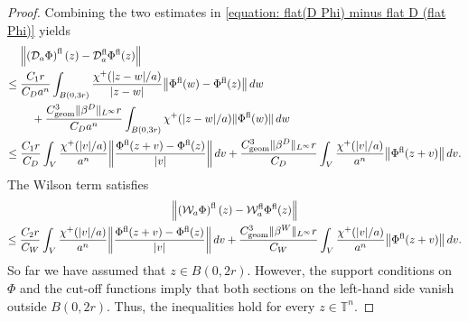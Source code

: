 \documentclass[a4paper,oneside,12pt]{amsart}
\theoremstyle{plain}
\theoremstyle{definition}
\theoremstyle{remark}
\DeclarePairedDelimiter{\abs}{\lvert}{\rvert}
\DeclarePairedDelimiter{\norm}{\lVert}{\rVert}
\newcommand{\flattorus}{\mathbb{T}^n}
\newcommand{\mesoscopicDiracoperator}[1][a]{\mathcal{D}_{#1}}
\newcommand{\mesoscopicWilsonterm}[1][a]{\mathcal{W}_{#1}}
\newcommand{\cutoff}{\beta}
\newcommand{\cutoffDirac}{\cutoff^D}
\newcommand{\cutoffWilson}{\cutoff^W}
\newcommand{\cutoffupper}{\chi^+}
\newcommand{\flatmesoscopicDiracoperator}{\mesoscopicDiracoperator^{\mathrm{fl}}}
\newcommand{\flatmesoscopicWilsonterm}{\mesoscopicWilsonterm^{\mathrm{fl}}}
\newcommand{\flatmodel}[1]{#1^{\mathrm{fl}}}
\newcommand{\constantgeometric}{C_{\mathrm{geom}}}
\begin{document}
\begin{proof}
  Combining the two estimates in \eqref{equation: flat(D Phi) minus flat D (flat Phi)} yields
  \begin{equation}
    \begin{aligned}
    & \norm*{\flatmodel{\left(\mesoscopicDiracoperator \Phi\right)}(z) - \flatmesoscopicDiracoperator \flatmodel{\Phi}(z)} \\
    \le{}&
    \begin{multlined}[t]
      \frac{C_1 r}{C_D a^n} \int_{B(0,3r)} \frac{\cutoffupper(\abs{z-w}/a)}{\abs{z-w}} \norm*{\flatmodel{\Phi}(w) - \flatmodel{\Phi}(z)} \,dw \\ + \frac{\constantgeometric^3 \norm{\cutoffDirac}_{L^{\infty}} r}{C_D a^n} \int_{B(0,3r)} \cutoffupper(\abs{z-w}/a) \norm{\flatmodel{\Phi}(w)} \,dw
    \end{multlined} \\
    \le{}& \frac{C_1 r}{C_D} \int_V \frac{\cutoffupper(\abs{v}/a)}{a^n} \norm*{\frac{\flatmodel{\Phi}(z+v) - \flatmodel{\Phi}(z)}{\abs{v}}} \,dv + \frac{\constantgeometric^3 \norm{\cutoffDirac}_{L^{\infty}} r}{C_D} \int_V \frac{\cutoffupper(\abs{v}/a)}{a^n} \norm*{\flatmodel{\Phi}(z+v)} \,dv.
    \end{aligned}
  \end{equation}
  The Wilson term satisfies
  \begin{multline}
    \norm*{\flatmodel{\left(\mesoscopicWilsonterm \Phi\right)}(z) - \flatmesoscopicWilsonterm \flatmodel{\Phi}(z)} \\
    \le \frac{C_2 r}{C_W} \int_V \frac{\cutoffupper(\abs{v}/a)}{a^n} \norm*{\frac{\flatmodel{\Phi}(z+v) - \flatmodel{\Phi}(z)}{\abs{v}}} \,dv + \frac{\constantgeometric^3 \norm{\cutoffWilson}_{L^{\infty}} r}{C_W} \int_V \frac{\cutoffupper(\abs{v}/a)}{a^n} \norm*{\flatmodel{\Phi}(z+v)} \,dv.
  \end{multline}
  So far we have assumed that $z\in B(0,2r)$.
  However, the support conditions on $\Phi$ and the cut-off functions imply that both sections on the left-hand side vanish outside $B(0,2r)$.
  Thus, the inequalities hold for every $z \in \flattorus$.


\end{proof}
\end{document}
